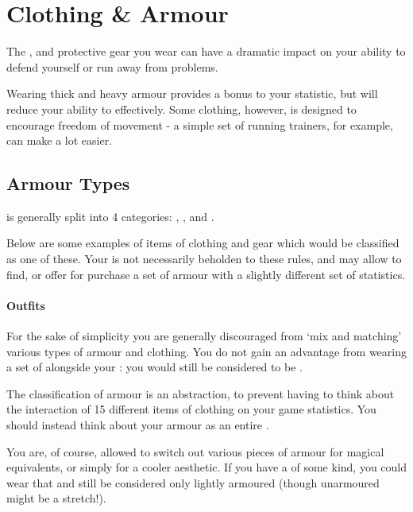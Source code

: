 \chapter{Clothing \& Armour} \label{S:Armour}

The ,  and protective gear you wear can have a dramatic impact on your ability to defend yourself\comma{} or run away from problems. 

Wearing thick and heavy armour provides a bonus to your  statistic, but will reduce your ability to  effectively. Some clothing, however, is designed to encourage freedom of movement - a simple set of running trainers, for example, can make  a lot easier.  

\section{Armour Types}

 is generally split into 4 categories: , ,  and .

Below are some examples of items of clothing and gear which would be classified as one of these. Your  is not necessarily beholden to these rules, and may allow to find, or offer for purchase a set of armour with a slightly different set of statistics.

\subsubsection{Outfits}

For the sake of simplicity\comma{} you are generally discouraged from `mix and matching' various types of armour and clothing. You do not gain an advantage from wearing a set of  alongside your : you would still be considered to be .

The classification of armour is an abstraction, to prevent having to think about the interaction of 15 different items of clothing on your game statistics. You should instead think about your armour as an entire . 

You are, of course, allowed to switch out various pieces of armour for magical equivalents, or simply for a cooler aesthetic. If you have a  of some kind, you could wear that and still be considered only lightly armoured (though unarmoured might be a stretch!).   


